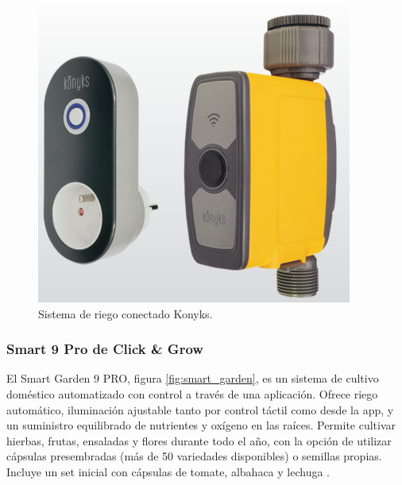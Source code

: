 \begin{figure}[H]
	\centering
	\includegraphics[scale=.4]{./Figures/kit_konyks.png}
	\caption{Sistema de riego conectado Konyks\protect\footnotemark.}
	\label{fig:kit_konyks}
\end{figure}






\subsubsection{Smart 9 Pro de Click \& Grow}
El Smart Garden 9 PRO, figura \ref{fig:smart_garden}, es un sistema de cultivo doméstico automatizado con control a través de una aplicación. Ofrece riego automático, iluminación ajustable tanto por control táctil como desde la app, y un suministro equilibrado de nutrientes y oxígeno en las raíces. Permite cultivar hierbas, frutas, ensaladas y flores durante todo el año, con la opción de utilizar cápsulas presembradas (más de 50 variedades disponibles) o semillas propias. Incluye un set inicial con cápsulas de tomate, albahaca y lechuga \cite{SMART:9}.

